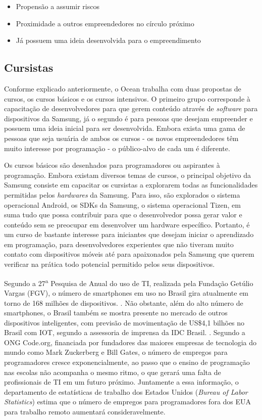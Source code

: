 \begin{itemize}
\item Propensão a assumir riscos
\item Proximidade a outros empreendedores no círculo próximo
\item Já possuem uma ideia desenvolvida para o empreendimento
\end{itemize}


\subsection{Cursistas}
\label{sec:con_cursistas}

Conforme explicado anteriormente, o Ocean trabalha com duas propostas de cursos, os cursos básicos e os cursos intensivos. O primeiro grupo corresponde à capacitação de desenvolvedores para que gerem conteúdo através de \textit{software} para dispositivos da Samsung, já o segundo é para pessoas que desejam empreender e possuem uma ideia inicial para ser desenvolvida. Embora exista uma gama de pessoas que seja usuária de ambos os cursos - os novos empreendedores têm muito interesse por programação - o público-alvo de cada um é diferente.

Os cursos básicos são desenhados para programadores ou aspirantes à programação. Embora existam diversos temas de cursos, o principal objetivo da Samsung consiste em capacitar os cursistas a explorarem todas as funcionalidades permitidas pelos \textit{hardwares} da Samsung. Para isso, são explorados o sistema operacional Android, os SDKs da Samsung, o sistema operacional Tizen, em suma tudo que possa contribuir para que o desenvolvedor possa gerar valor e conteúdo sem se preocupar em desenvolver um hardware específico. Portanto, é um curso de bastante interesse para iniciantes que desejam iniciar o aprendizado em programação, para desenvolvedores experientes que não tiveram muito contato com dispositivos móveis até para apaixonados pela Samsung que querem verificar na prática todo potencial permitido pelos seus dispositivos.

Segundo a 27\textsuperscript{a} Pesquisa de Anual do uso de TI, realizada pela Fundação Getúlio Vargas (FGV), o número de smartphones em uso no Brasil gira atualmente em torno de 168 milhões de dispositivos. \cite{tifgv}. Não obstante, além do alto número de smartphones, o Brasil também se mostra presente no mercado de outros dispositivos inteligentes, com previsão de movimentação de US\$4,1 bilhões no Brasil com IOT, segundo a assessoria de imprensa da IDC Brasil. \cite{idc}. Segundo a ONG Code.org, financiada por fundadores das maiores empresas de tecnologia do mundo como Mark Zuckerberg e Bill Gates, o número de empregos para programadores cresce exponencialmente, ao passo que o ensino de programação nas escolas não acompanha o mesmo ritmo, o que gerará uma falta de profissionais de TI em um futuro próximo. Juntamente a essa informação, o departamento de estatísticas de trabalho dos Estados Unidos (\textit{Bureau of Labor Statistics}) estima que o número de empregos para programadores fora dos EUA para trabalho remoto aumentará consideravelmente. \cite{bls}

